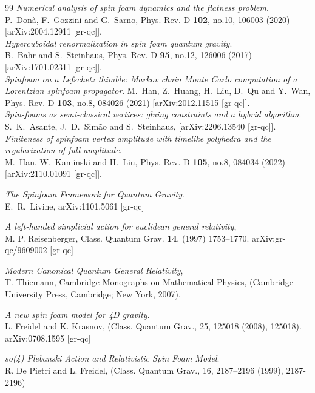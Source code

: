 \documentclass{article}
\begin{document}
\begin{thebibliography}{99}
\emph{Numerical analysis of spin foam dynamics and the flatness problem}.\\
P.~Don\`a, F.~Gozzini and G.~Sarno,
Phys. Rev. D \textbf{102}, no.10, 106003 (2020)
[arXiv:2004.12911 [gr-qc]].\\
\emph{Hypercuboidal renormalization in spin foam quantum gravity}.\\
B.~Bahr and S.~Steinhaus,
Phys. Rev. D \textbf{95}, no.12, 126006 (2017)
[arXiv:1701.02311 [gr-qc]].\\

\emph{Spinfoam on a Lefschetz thimble: Markov chain Monte Carlo computation of a Lorentzian spinfoam propagator}.
M.~Han, Z.~Huang, H.~Liu, D.~Qu and Y.~Wan,
Phys. Rev. D \textbf{103}, no.8, 084026 (2021)
[arXiv:2012.11515 [gr-qc]].\\
\emph{Spin-foams as semi-classical vertices: gluing constraints and a hybrid algorithm}.
S.~K.~Asante, J.~D.~Sim\~ao and S.~Steinhaus,
[arXiv:2206.13540 [gr-qc]].\\
\emph{Finiteness of spinfoam vertex amplitude with timelike polyhedra and the regularization of full amplitude}.\\
M.~Han, W.~Kaminski and H.~Liu,
Phys. Rev. D \textbf{105}, no.8, 084034 (2022)
[arXiv:2110.01091 [gr-qc]].


\emph{The Spinfoam Framework for Quantum Gravity}.\\
E.~R.~Livine,
arXiv:1101.5061 [gr-qc]



\emph{A left-handed simplicial action for euclidean general relativity},\\
M. P. Reisenberger, 
Class. Quantum Grav. {\bf 14}, (1997) 1753–1770.
arXiv:gr-qc/9609002 [gr-qc]

\emph{Modern Canonical Quantum General Relativity},\\
T. Thiemann,
Cambridge Monographs on Mathematical
Physics, (Cambridge University Press, Cambridge; New York, 2007).


\emph{A new spin foam model for 4D gravity}.\\
L. Freidel and K. Krasnov,
(Class. Quantum Grav., 25,
125018 (2008), 125018).
arXiv:0708.1595 [gr-qc]

\emph{\textit{so}(4) Plebanski Action and Relativistic Spin Foam Model}.\\
R. De Pietri and L. Freidel,
(Class. Quantum Grav., 16, 2187–2196 (1999), 2187-2196)


\end{thebibliography}
\end{document}
